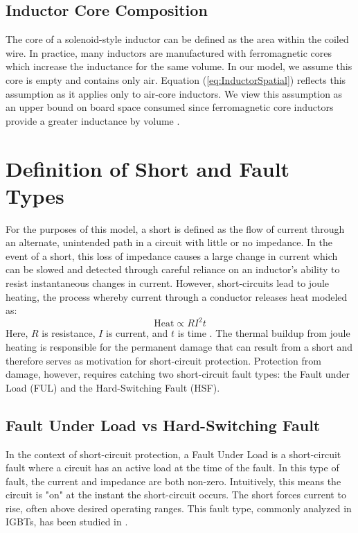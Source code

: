 \documentclass[11pt,oneside]{report}
\begin{document}
    \subsection{Inductor Core Composition}
    The core of a solenoid-style inductor can be defined as the area within the coiled wire. In practice, many inductors are manufactured with ferromagnetic cores which increase the inductance for the same volume. In our model, we assume this core is empty and contains only air. Equation (\ref{eq:InductorSpatial}) reflects this assumption as it applies only to air-core inductors. We view this assumption as an upper bound on board space consumed since ferromagnetic core inductors provide a greater inductance by volume \cite{NiFe}.
    
    \section{Definition of Short and Fault Types}
    For the purposes of this model, a short is defined as the flow of current through an alternate, unintended path in a circuit with little or no impedance. In the event of a short, this loss of impedance causes a large change in current which can be slowed and detected through careful reliance on an inductor's ability to resist instantaneous changes in current. However, short-circuits lead to joule heating, the process whereby current through a conductor releases heat modeled as:
    \begin{equation}\label{eq:JouleHeating}
    \text{Heat} \propto R I^{2} t
    \end{equation}
    Here, $R$ is resistance, $I$ is current, and $t$ is time \cite{uniphy}. The thermal buildup from joule heating is responsible for the permanent damage that can result from a short and therefore serves as motivation for short-circuit protection. Protection from damage, however, requires catching two short-circuit fault types: the Fault under Load (FUL) and the Hard-Switching Fault (HSF).
    
    \subsection{Fault Under Load vs Hard-Switching Fault}
    In the context of short-circuit protection, a Fault Under Load is a short-circuit fault where a circuit has an active load at the time of the fault. In this type of fault, the current and impedance are both non-zero. Intuitively, this means the circuit is "on" at the instant the short-circuit occurs. The short forces current to rise, often above desired operating ranges. This fault type, commonly analyzed in IGBTs, has been studied in \cite{scanalysis}.
    
\end{document}
